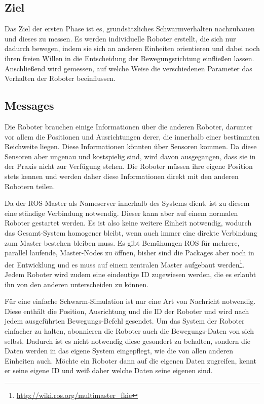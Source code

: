 \subsection*{Ziel}

Das Ziel der ersten Phase ist es, grundsätzliches Schwarmverhalten nachzubauen und dieses zu messen. Es werden individuelle Roboter erstellt, die sich nur dadurch bewegen, indem sie sich an anderen Einheiten orientieren und dabei noch ihren freien Willen in die Entscheidung der Bewegungsrichtung einfließen lassen. Anschließend wird gemessen, auf welche Weise die verschiedenen Parameter das Verhalten der Roboter beeinflussen.

\subsection*{Messages}\label{subsec:NachbauNachrichten}

Die Roboter brauchen einige Informationen über die anderen Roboter, darunter vor allem die Positionen und Ausrichtungen derer, die innerhalb einer bestimmten Reichweite liegen. Diese Informationen könnten über Sensoren kommen. Da diese Sensoren aber ungenau und kostspielig sind, wird davon ausgegangen, dass sie in der Praxis nicht zur Verfügung stehen. Die Roboter müssen ihre eigene Position stets kennen und werden daher diese Informationen direkt mit den anderen Robotern teilen.

Da der ROS-Master als Nameserver innerhalb des Systems dient, ist zu diesem eine ständige Verbindung notwendig. Dieser kann aber auf einem normalen Roboter gestartet werden. Es ist also keine weitere Einheit notwendig, wodurch das Gesamt-System homogener bleibt, wenn auch immer eine direkte Verbindung zum Master bestehen bleiben muss. Es gibt Bemühungen ROS für mehrere, parallel laufende, Master-Nodes zu öffnen, bisher sind die Packages aber noch in der Entwicklung und es muss auf einem zentralen Master aufgebaut werden\footnote{\url{http://wiki.ros.org/multimaster_fkie}}.
Jedem Roboter wird zudem eine eindeutige ID zugewiesen werden, die es erlaubt ihn von den anderen unterscheiden zu können.

Für eine einfache Schwarm-Simulation ist nur eine Art von Nachricht notwendig. Diese enthält die Position, Ausrichtung und die ID der Roboter und wird nach jedem ausgeführten Bewegungs-Befehl gesendet. Um das System der Roboter einfacher zu halten, abonnieren die Roboter auch die Bewegungs-Daten von sich selbst. Dadurch ist es nicht notwendig diese gesondert zu behalten, sondern die Daten werden in das eigene System eingepflegt, wie die von allen anderen Einheiten auch. Möchte ein Roboter dann auf die eigenen Daten zugreifen, kennt er seine eigene ID und weiß daher welche Daten seine eigenen sind.

